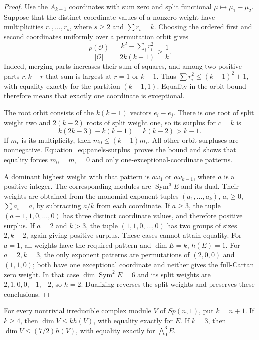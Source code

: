 \begin{proof}
Use the $A_{k-1}$ coordinates with sum zero and split functional
$\mu\mapsto\mu_1-\mu_2$. Suppose that the distinct coordinate
values of a nonzero weight have multiplicities
$r_1,\ldots,r_s$, where $s\geq2$ and $\sum r_i=k$.
Choosing the ordered first and second coordinates uniformly over a
permutation orbit gives
\[
 \frac{p(\mathcal O)}{|\mathcal O|}
 =\frac{k^2-\sum_i r_i^2}{2k(k-1)}\geq\frac1k.
\]
Indeed, merging parts increases their sum of squares, and among
two positive parts $r,k-r$ that sum is largest at $r=1$ or
$k-1$. Thus $\sum r_i^2\leq(k-1)^2+1$, with equality
exactly for the partition $(k-1,1)$. Equality in the orbit bound
therefore means that exactly one coordinate is exceptional.

The root orbit consists of the $k(k-1)$ vectors $e_i-e_j$.
There is one root of split weight two and $2(k-2)$ roots of split
weight one, so its surplus for $c=k$ is
\[
 k(2k-3)-k(k-1)=k(k-2)>k-1.
\]
If $m_{\mathrm r}$ is its multiplicity, then
$m_0\leq(k-1)m_{\mathrm r}$. All other orbit surpluses are
nonnegative. Equation~\eqref{eq:panels-surplus} proves the bound
and shows that equality forces $m_0=m_{\mathrm r}=0$ and only
one-exceptional-coordinate patterns.

A dominant highest weight with that pattern is
$a\omega_1$ or $a\omega_{k-1}$, where $a$ is a positive
integer. The corresponding modules are
$\operatorname{Sym}^aE$ and its dual. Their weights are obtained
from the monomial exponent tuples
$(a_1,\ldots,a_k)$, $a_i\geq0$, $\sum a_i=a$, by subtracting
$a/k$ from each coordinate. If $a\geq3$, the tuple
$(a-1,1,0,\ldots,0)$ has three distinct coordinate values, and
therefore positive surplus. If $a=2$ and $k>3$, the tuple
$(1,1,0,\ldots,0)$ has two groups of sizes $2,k-2$, again
giving positive surplus. These cases cannot attain equality.
For $a=1$, all weights have the required pattern and
$\dim E=k$, $h(E)=1$. For $a=2,k=3$, the only exponent
patterns are permutations of $(2,0,0)$ and $(1,1,0)$; both have
one exceptional coordinate and neither gives the full-Cartan zero
weight. In that case $\dim\operatorname{Sym}^2E=6$ and its
split weights are $2,1,0,0,-1,-2$, so $h=2$. Dualizing reverses
the split weights and preserves these conclusions.
\end{proof}

\begin{lemma}\label{lem:panels-symplectic-ratio}
For every nontrivial irreducible complex module $V$ of $Sp(n,1)$,
put $k=n+1$. If $k\geq4$, then
$\dim V\leq k h(V)$, with equality exactly for $E$.
If $k=3$, then $\dim V\leq(7/2)h(V)$, with equality exactly
for $\bigwedge^3_0E$.
\end{lemma}

